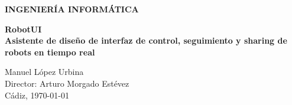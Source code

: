 \begin{titlepage}
\begin{center}
    \Large{\textbf{INGENIERÍA INFORMÁTICA}} \\

    \vspace{3.0cm}

    \Large{\textbf{RobotUI\\ Asistente de diseño de interfaz de control,
seguimiento y sharing de robots en tiempo real }} \\

    \vspace{3.0cm}

    \normalsize{Manuel López Urbina \\
    Director: Arturo Morgado Estévez }\\

    \vspace{1.5cm}
    Cádiz, \today

  \end{center}
\end{titlepage}


